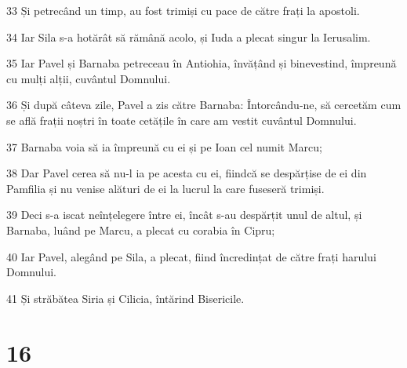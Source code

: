 \par 33 Și petrecând un timp, au fost trimiși cu pace de către frați la apostoli.
\par 34 Iar Sila s-a hotărât să rămână acolo, și Iuda a plecat singur la Ierusalim.
\par 35 Iar Pavel și Barnaba petreceau în Antiohia, învățând și binevestind, împreună cu mulți alții, cuvântul Domnului.
\par 36 Și după câteva zile, Pavel a zis către Barnaba: Întorcându-ne, să cercetăm cum se află frații noștri în toate cetățile în care am vestit cuvântul Domnului.
\par 37 Barnaba voia să ia împreună cu ei și pe Ioan cel numit Marcu;
\par 38 Dar Pavel cerea să nu-l ia pe acesta cu ei, fiindcă se despărțise de ei din Pamfilia și nu venise alături de ei la lucrul la care fuseseră trimiși.
\par 39 Deci s-a iscat neînțelegere între ei, încât s-au despărțit unul de altul, și Barnaba, luând pe Marcu, a plecat cu corabia în Cipru;
\par 40 Iar Pavel, alegând pe Sila, a plecat, fiind încredințat de către frați harului Domnului.
\par 41 Și străbătea Siria și Cilicia, întărind Bisericile.

\chapter{16}

